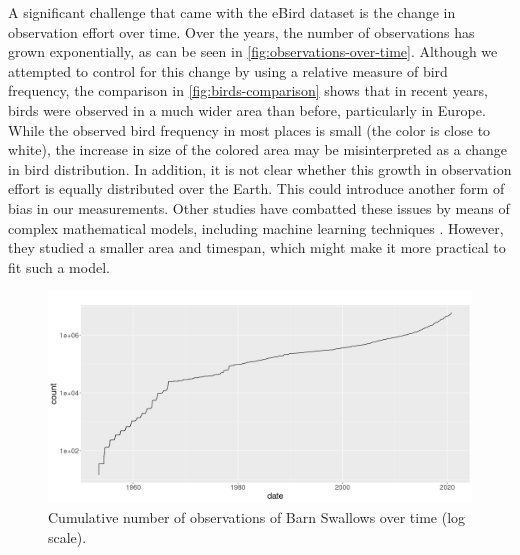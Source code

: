 \documentclass[journal]{vgtc}                %
\begin{document}
A significant challenge that came with the eBird dataset is the change in observation effort over time. Over the years, the number of observations has grown exponentially, as can be seen in \autoref{fig:observations-over-time}. Although we attempted to control for this change by using a relative measure of bird frequency, the comparison in \autoref{fig:birds-comparison} shows that in recent years, birds were observed in a much wider area than before, particularly in Europe. While the observed bird frequency in most places is small (the color is close to white), the increase in size of the colored area may be misinterpreted as a change in bird distribution. In addition, it is not clear whether this growth in observation effort is equally distributed over the Earth. This could introduce another form of bias in our measurements. Other studies have combatted these issues by means of complex mathematical models, including machine learning techniques \cite{johnston2019best,johnston2020analytical}. However, they studied a smaller area and timespan, which might make it more practical to fit such a model.

\begin{figure}[t]
  \centering
  \includegraphics[width=\linewidth]{observations-over-time}
  \caption{Cumulative number of observations of Barn Swallows over time (log scale).}
  \label{fig:observations-over-time}
\end{figure}
\end{document}
